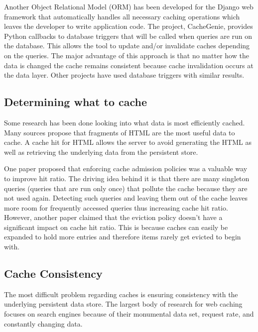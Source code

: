 \documentclass[12pt]{article}
\begin{document}
Another Object Relational Model (ORM) has been developed for the Django web framework that automatically handles all necessary caching operations which leaves the developer to write application code.\cite{triggerBasedORM}
The project, CacheGenie, provides Python callbacks to database triggers that will be called when queries are run on the database. This allows the tool to update and/or invalidate caches depending on the queries.
The major advantage of this approach is that no matter how the data is changed the cache remains consistent because cache invalidation occurs at the data layer.
Other projects have used database triggers with similar results.\cite{scalableConsistentCaching}

\subsection{Determining what to cache}
Some research has been done looking into what data is most efficiently cached.
Many sources propose that fragments of HTML are the most useful data to cache.\cite{comparisonOfCachingSolutions}\cite{scalableConsistentCaching}
A cache hit for HTML allows the server to avoid generating the HTML as well as retrieving the underlying data from the persistent store.\cite{howBasecampGotSoFast}

One paper proposed that enforcing cache admission policies was a valuable way to improve hit ratio.\cite{cacheAdmissionPolicies}
The driving idea behind it is that there are many singleton queries (queries that are run only once) that pollute the cache because they are not used again.
Detecting such queries and leaving them out of the cache leaves more room for frequently accessed queries thus increasing cache hit ratio.
However, another paper claimed that the eviction policy doesn't have a significant impact on cache hit ratio.\cite{refreshingPerspectiveSearch}
This is because caches can easily be expanded to hold more entries and therefore items rarely get evicted to begin with.\cite{refreshingPerspectiveSearch}

\subsection{Cache Consistency}
The most difficult problem regarding caches is ensuring consistency with the underlying persistent data store.
The largest body of research for web caching focuses on search engines because of their monumental data set, request rate, and constantly changing data.
\end{document}
